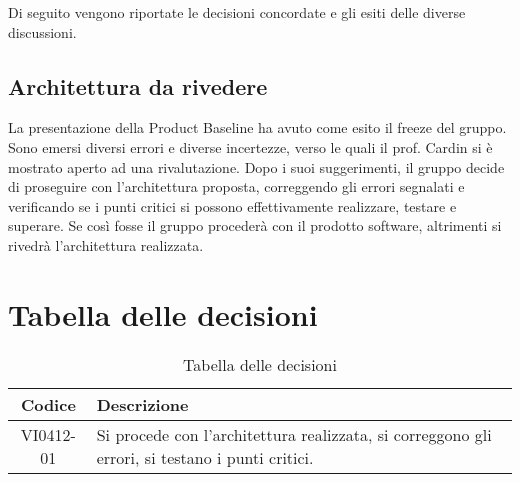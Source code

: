 \documentclass{article}
\begin{document}
Di seguito vengono riportate le decisioni concordate e gli esiti delle diverse discussioni.

\subsection{Architettura da rivedere}
\label{itm:1}

La presentazione della Product Baseline ha avuto come esito il freeze del gruppo. Sono emersi diversi errori e diverse incertezze, 
verso le quali il prof. Cardin si è mostrato aperto ad una rivalutazione. Dopo i suoi suggerimenti, il gruppo decide di proseguire 
con l'architettura proposta, correggendo gli errori segnalati e verificando se i punti critici si possono effettivamente realizzare, 
testare e superare. Se così fosse il gruppo procederà con il prodotto software, altrimenti si rivedrà l'architettura realizzata.


\section{Tabella delle decisioni}%
\label{sub:decisioni}

\begin{table}[!ht]
	\centering
	\begin{tabular}{|c|p{13cm}|}
		\hline
		\rowcolor{lightgray}
		\textbf{Codice} & \textbf{Descrizione} \\ 
		\hline
			VI0412-01 & Si procede con l'architettura realizzata, si correggono gli errori, si testano i punti critici. \\
		\hline
	\end{tabular}
	\caption{Tabella delle decisioni}
\end{table}
\end{document}
